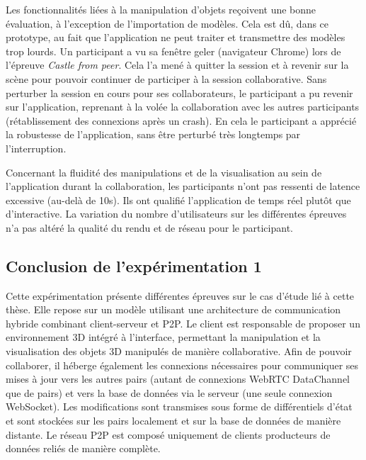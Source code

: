 Les fonctionnalités liées à la manipulation d'objets reçoivent une bonne évaluation, 
à l'exception de l'importation de modèles. Cela est dû, dans ce prototype, au 
fait que l'application ne peut traiter et transmettre des modèles trop lourds. Un 
participant a vu sa fenêtre \og geler\fg{} (navigateur Chrome) lors de l'épreuve 
\textit{Castle from peer}. Cela l'a mené à quitter la session et à revenir sur la 
scène pour pouvoir continuer de participer à la session collaborative. Sans 
perturber la session en cours pour ses collaborateurs, le participant a pu revenir sur 
l'application, reprenant à la volée la collaboration avec les autres participants 
(rétablissement 
des connexions après un crash). En cela le participant a apprécié la robustesse de 
l'application, sans être perturbé très longtemps par l'interruption.

Concernant la fluidité des manipulations et de la visualisation au sein de 
l'application durant la collaboration, les participants n'ont pas ressenti de latence 
excessive (au-delà de 10s). Ils ont qualifié l'application de \og temps réel\fg{} plutôt 
que d'\og interactive\fg{}. La variation du nombre d'utilisateurs sur les différentes 
épreuves n'a pas altéré la qualité du rendu et de réseau pour le participant.

\subsection{Conclusion de l'expérimentation 1}


Cette expérimentation présente différentes épreuves sur le cas d'étude lié à cette 
thèse. Elle repose sur un modèle utilisant une architecture de communication 
hybride combinant client-serveur et \gls{P2P}. Le client est responsable de 
proposer un environnement \gls{3D} intégré à l'interface, permettant la 
manipulation et la visualisation des objets \gls{3D} manipulés de manière 
collaborative. Afin de pouvoir collaborer, il héberge également les connexions 
nécessaires pour communiquer ses mises à jour vers les autres pairs 
(autant de connexions WebRTC DataChannel que de pairs) et vers la base de données
via le serveur (une seule connexion WebSocket). Les modifications sont transmises
sous forme de différentiels d'état et sont stockées sur les pairs localement et 
sur la base de données de manière distante. 
Le réseau \gls{P2P} est composé uniquement de clients producteurs de 
données reliés de manière complète. 

